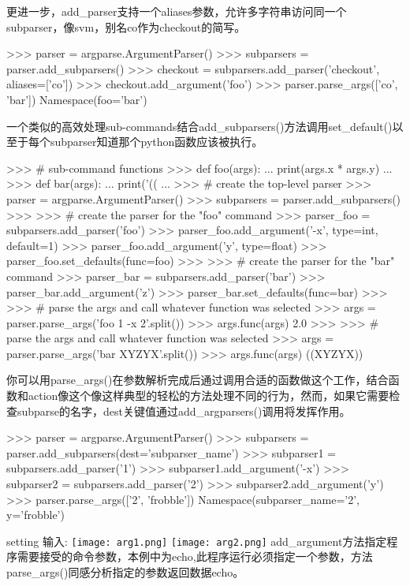 更进一步，add\_parser支持一个aliases参数，允许多字符串访问同一个subparser，像svm，别名co作为checkout的简写。
\begin{python}
>>> parser = argparse.ArgumentParser()
>>> subparsers = parser.add_subparsers()
>>> checkout = subparsers.add_parser('checkout', aliases=['co'])
>>> checkout.add_argument('foo')
>>> parser.parse_args(['co', 'bar'])
Namespace(foo='bar')
\end{python}
一个类似的高效处理sub-commands结合add\_subparsers()方法调用set\_default()以至于每个subparser知道那个python函数应该被执行。
\begin{python}
>>> # sub-command functions
>>> def foo(args):
...     print(args.x * args.y)
...
>>> def bar(args):
...     print('((%
...
>>> # create the top-level parser
>>> parser = argparse.ArgumentParser()
>>> subparsers = parser.add_subparsers()
>>>
>>> # create the parser for the "foo" command
>>> parser_foo = subparsers.add_parser('foo')
>>> parser_foo.add_argument('-x', type=int, default=1)
>>> parser_foo.add_argument('y', type=float)
>>> parser_foo.set_defaults(func=foo)
>>>
>>> # create the parser for the "bar" command
>>> parser_bar = subparsers.add_parser('bar')
>>> parser_bar.add_argument('z')
>>> parser_bar.set_defaults(func=bar)
>>>
>>> # parse the args and call whatever function was selected
>>> args = parser.parse_args('foo 1 -x 2'.split())
>>> args.func(args)
2.0
>>>
>>> # parse the args and call whatever function was selected
>>> args = parser.parse_args('bar XYZYX'.split())
>>> args.func(args)
((XYZYX))
\end{python}
你可以用parse\_args()在参数解析完成后通过调用合适的函数做这个工作，结合函数和action像这个像这样典型的轻松的方法处理不同的行为，然而，如果它需要检查subparse的名字，dest关键值通过add\_argparsers()调用将发挥作用。
\begin{python}
>>> parser = argparse.ArgumentParser()
>>> subparsers = parser.add_subparsers(dest='subparser_name')
>>> subparser1 = subparsers.add_parser('1')
>>> subparser1.add_argument('-x')
>>> subparser2 = subparsers.add_parser('2')
>>> subparser2.add_argument('y')
>>> parser.parse_args(['2', 'frobble'])
Namespace(subparser_name='2', y='frobble')
\end{python}
setting
输入:\newline
\texttt{[image: arg1.png]}\newline
\texttt{[image: arg2.png]}\newline
add\_argument方法指定程序需要接受的命令参数，本例中为echo,此程序运行必须指定一个参数，方法parse\_args()同感分析指定的参数返回数据echo。
